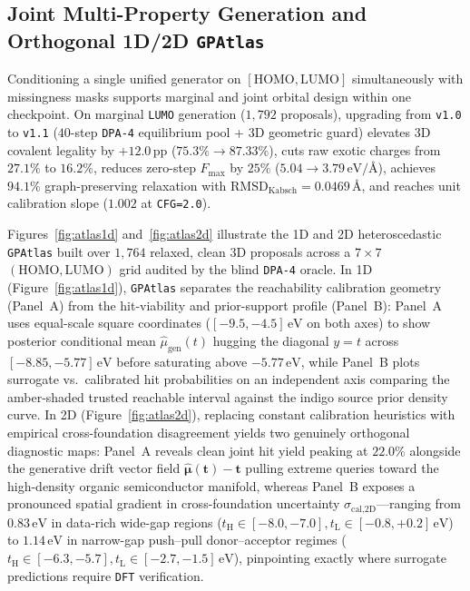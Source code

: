 \documentclass[11pt,a4paper]{article}
\begin{document}
\subsection{Joint Multi-Property Generation and Orthogonal 1D/2D \texttt{GPAtlas}}
\label{sec:exp_atlas}

Conditioning a single unified generator on $[\text{HOMO}, \text{LUMO}]$ simultaneously with missingness masks supports marginal and joint orbital design within one checkpoint. On marginal \texttt{LUMO} generation ($1{,}792$ proposals), upgrading from \texttt{v1.0} to \texttt{v1.1} ($40$-step \texttt{DPA-4} equilibrium pool + 3D geometric guard) elevates 3D covalent legality by $+12.0\,\text{pp}$ ($75.3\% \to 87.33\%$), cuts raw exotic charges from $27.1\%$ to $16.2\%$, reduces zero-step $F_{\max}$ by $25\%$ ($5.04 \to 3.79\,\text{eV/\AA}$), achieves $94.1\%$ graph-preserving relaxation with $\text{RMSD}_{\text{Kabsch}} = 0.0469\,\text{\AA}$, and reaches unit calibration slope ($1.002$ at \texttt{CFG=2.0}).

Figures~\ref{fig:atlas1d} and~\ref{fig:atlas2d} illustrate the 1D and 2D heteroscedastic \texttt{GPAtlas} built over $1{,}764$ relaxed, clean 3D proposals across a $7 \times 7$ $(\text{HOMO}, \text{LUMO})$ grid audited by the blind \texttt{DPA-4} oracle. In 1D (Figure~\ref{fig:atlas1d}), \texttt{GPAtlas} separates the reachability calibration geometry (Panel~A) from the hit-viability and prior-support profile (Panel~B): Panel~A uses equal-scale square coordinates ($[-9.5, -4.5]\,\text{eV}$ on both axes) to show posterior conditional mean $\hat{\mu}_{\text{gen}}(t)$ hugging the diagonal $y = t$ across $[-8.85, -5.77]\,\text{eV}$ before saturating above $-5.77\,\text{eV}$, while Panel~B plots surrogate vs.\ calibrated hit probabilities on an independent axis comparing the amber-shaded trusted reachable interval against the indigo source prior density curve. In 2D (Figure~\ref{fig:atlas2d}), replacing constant calibration heuristics with empirical cross-foundation disagreement yields two genuinely orthogonal diagnostic maps: Panel~A reveals clean joint hit yield peaking at $22.0\%$ alongside the generative drift vector field $\hat{\boldsymbol{\mu}}(\mathbf{t}) - \mathbf{t}$ pulling extreme queries toward the high-density organic semiconductor manifold, whereas Panel~B exposes a pronounced spatial gradient in cross-foundation uncertainty $\sigma_{\text{cal,2D}}$---ranging from $0.83\,\text{eV}$ in data-rich wide-gap regions ($t_{\text{H}} \in [-8.0, -7.0], t_{\text{L}} \in [-0.8, +0.2]\,\text{eV}$) to $1.14\,\text{eV}$ in narrow-gap push--pull donor--acceptor regimes ($t_{\text{H}} \in [-6.3, -5.7], t_{\text{L}} \in [-2.7, -1.5]\,\text{eV}$), pinpointing exactly where surrogate predictions require \texttt{DFT} verification.
\end{document}

